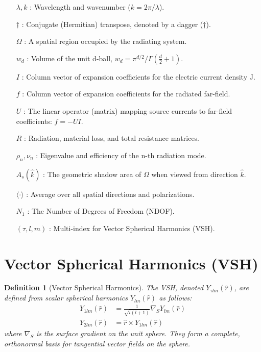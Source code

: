 \documentclass[11pt,a4paper]{article}
\newtheorem{definition}[theorem]{Definition}
\begin{document}
\begin{itemize}
    \item[\(\lambda, k\)]: Wavelength and wavenumber ($k=2\pi/\lambda$).
    \item[\(\dagger\)]: Conjugate (Hermitian) transpose, denoted by a dagger (\(\dagger\)).
    \item[\(\Omega\)]: A spatial region occupied by the radiating system.
    \item[\(w_{d}\)]: Volume of the unit d-ball, \(w_{d}=\pi^{d/2}/\Gamma(\frac{d}{2}+1)\).
    \item[\(I\)]: Column vector of expansion coefficients for the electric current density J.
    \item[\(f\)]: Column vector of expansion coefficients for the radiated far-field.
    \item[\(U\)]: The linear operator (matrix) mapping source currents to far-field coefficients: \(f = -UI\).
    \item[\(R\)]: Radiation, material loss, and total resistance matrices.
    \item[\(\rho_{n}, \nu_{n}\)]: Eigenvalue and efficiency of the n-th radiation mode.
    \item[\(A_{s}(\hat{k})\)]: The geometric shadow area of \(\Omega\) when viewed from direction \(\hat{k}\).
    \item[\(\langle \cdot \rangle\)]: Average over all spatial directions and polarizations.
    \item[\(N_{1}\)]: The Number of Degrees of Freedom (NDOF).
    \item[\((\tau, l, m)\)]: Multi-index for Vector Spherical Harmonics (VSH).
\end{itemize}

\section{Vector Spherical Harmonics (VSH)}

\begin{definition}[Vector Spherical Harmonics]
The VSH, denoted \(Y_{\tau lm}(\hat{r})\), are defined from scalar spherical harmonics \(Y_{lm}(\hat{r})\) as follows:
\begin{align}
    Y_{1lm}(\hat{r}) &= \frac{1}{\sqrt{l(l+1)}}\nabla_{S}Y_{lm}(\hat{r}) \\
    Y_{2lm}(\hat{r}) &= \hat{r}\times Y_{1lm}(\hat{r})
\end{align}
where \(\nabla_{S}\) is the surface gradient on the unit sphere. They form a complete, orthonormal basis for tangential vector fields on the sphere.
\end{definition}
\end{document}
